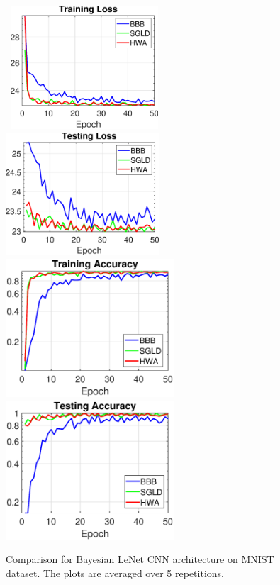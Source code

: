 \documentclass{article} %
\begin{document}
\begin{figure}[H]
\mbox{
\includegraphics[width=0.49\textwidth]{figs/trainlossmnist.eps}
\includegraphics[width=0.51\textwidth]{figs/testlossmnist.eps}
}
\mbox{
\hspace{-0.2in}\includegraphics[width=0.56\textwidth]{figs/trainaccmnist.eps}\hspace{-0.3in}
\includegraphics[width=0.56\textwidth]{figs/testaccmnist.eps}
}
\caption{Comparison for Bayesian LeNet CNN architecture on MNIST dataset. The plots are averaged over 5 repetitions.}
    \label{fig:mnist}
\end{figure}
\end{document}
